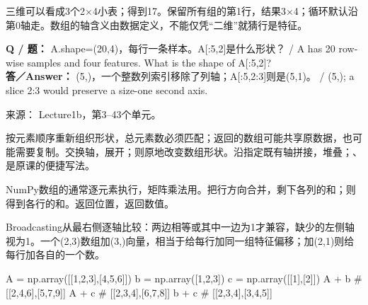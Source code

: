 三维可以看成3个2\ensuremath{\times}4小表；得到17。保留所有组的第1行，结果3\ensuremath{\times}4；循环默认沿第0轴走。数组的轴含义由数据定义，不能仅凭“二维”就猜行是特征。


\textbf{Q / 题：} A.shape=(20,4)，每行一条样本。A[:5,2]是什么形状？ / A has 20 row-wise samples and four features. What is the shape of A[:5,2]?\\

\textbf{答／Answer：} (5,)，一个整数列索引移除了列轴；A[:5,2:3]则是(5,1)。 / (5,); a slice 2:3 would preserve a size-one second axis.


来源： Lecture1b，第3–43个单元。








按元素顺序重新组织形状，总元素数必须匹配；返回的数组可能共享原数据，也可能需要复制。交换轴，展开；则原地改变数组形状。沿指定既有轴拼接，堆叠；、是原课的便捷写法。


NumPy数组的\StudyInline{+,\allowbreak{}-,\allowbreak{}*,\allowbreak{}**}通常逐元素执行，矩阵乘法用。把行方向合并，剩下各列的和；则得到各行的和。返回位置，返回数值。


Broadcasting从最右侧逐轴比较：两边相等或其中一边为1才兼容，缺少的左侧轴视为1。一个(2,3)数组加(3,)向量，相当于给每行加同一组特征偏移；加(2,1)则给每行加各自的一个数。



\begin{StudyCode}
A = np.array([[1,2,3],[4,5,6]])
b = np.array([1,2,3])
c = np.array([[1],[2]])
A + b   # [[2,4,6],[5,7,9]]
A + c   # [[2,3,4],[6,7,8]]
b + c   # [[2,3,4],[3,4,5]]
\end{StudyCode}



